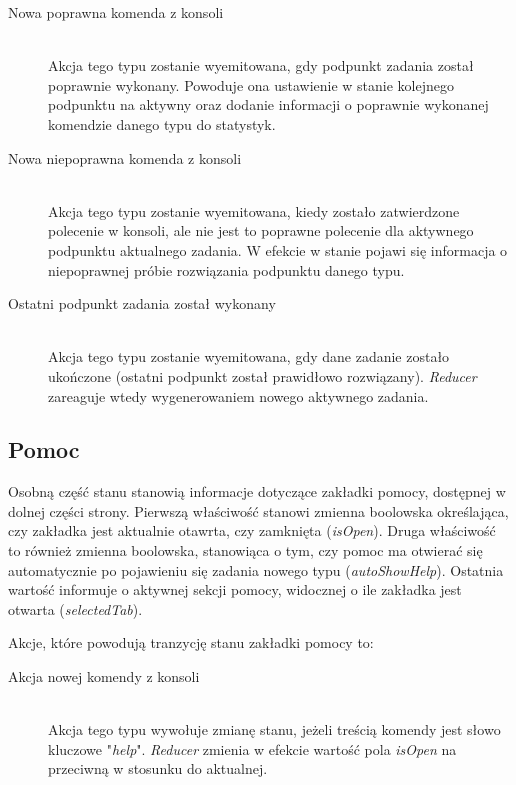 \documentclass[12pt,a4paper,polish,thesis]{dcsbook}
\begin{document}
{	\begin{description}
	\item[Nowa poprawna komenda z konsoli] \hfill \\
	Akcja tego typu zostanie wyemitowana, gdy podpunkt zadania został poprawnie wykonany. Powoduje ona ustawienie w stanie kolejnego podpunktu na aktywny oraz dodanie informacji o poprawnie wykonanej komendzie danego typu do statystyk.
	\item[Nowa niepoprawna komenda z konsoli] \hfill \\
	Akcja tego typu zostanie wyemitowana, kiedy zostało zatwierdzone polecenie w konsoli, ale nie jest to poprawne polecenie dla aktywnego podpunktu aktualnego zadania. W efekcie w stanie pojawi się informacja o niepoprawnej próbie rozwiązania podpunktu danego typu.
	\item[Ostatni podpunkt zadania został wykonany] \hfill \\
	Akcja tego typu zostanie wyemitowana, gdy dane zadanie zostało ukończone (ostatni podpunkt został prawidłowo rozwiązany). \textit{Reducer} zareaguje wtedy wygenerowaniem nowego aktywnego zadania.
	\end{description}
		
	\subsection{Pomoc} \label{PomocStan}
	
	Osobną część stanu stanowią informacje dotyczące zakładki pomocy, dostępnej w dolnej części strony. Pierwszą właściwość stanowi zmienna boolowska określająca, czy zakładka jest aktualnie otawrta, czy zamknięta (\textit{isOpen}). Druga właściwość to również zmienna boolowska, stanowiąca o tym, czy pomoc ma otwierać się automatycznie po pojawieniu się zadania nowego typu (\textit{autoShowHelp}). Ostatnia wartość informuje o aktywnej sekcji pomocy, widocznej o ile zakładka jest otwarta (\textit{selectedTab}).
	
	Akcje, które powodują tranzycję stanu zakładki pomocy to:
	
	\begin{description}
	\item[Akcja nowej komendy z konsoli] \hfill \\
	Akcja tego typu wywołuje zmianę stanu, jeżeli treścią komendy jest słowo kluczowe "\textit{help}". \textit{Reducer} zmienia w efekcie wartość pola \textit{isOpen} na przeciwną w stosunku do aktualnej.
	

\end{description}}
\end{document}
